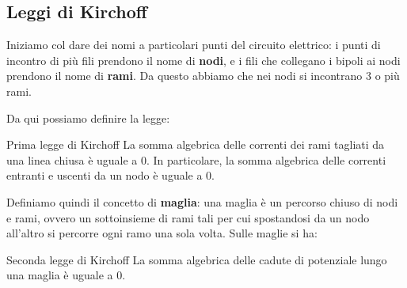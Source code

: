 \documentclass[a4paper,14pt]{memoir}
\begin{document}
\subsection{Leggi di Kirchoff}
Iniziamo col dare dei nomi a particolari punti del circuito elettrico: i punti di incontro di più fili prendono il nome di \textbf{nodi}, e i fili che collegano i bipoli ai nodi prendono il nome di \textbf{rami}.
Da questo abbiamo che nei nodi si incontrano 3 o più rami.

Da qui possiamo definire la legge:
\begin{theorem}{Prima legge di Kirchoff}
		La somma algebrica delle correnti dei rami tagliati da una linea chiusa è uguale a 0.
		In particolare, la somma algebrica delle correnti entranti e uscenti da un nodo è uguale a 0.
\end{theorem}

Definiamo quindi il concetto di \textbf{maglia}: una maglia è un percorso chiuso di nodi e rami, ovvero un sottoinsieme di rami tali per cui spostandosi da un nodo all'altro si percorre ogni ramo una sola volta.
Sulle maglie si ha:

\begin{theorem}{Seconda legge di Kirchoff}
	La somma algebrica delle cadute di potenziale lungo una maglia è uguale a 0.
\end{theorem}
\end{document}
